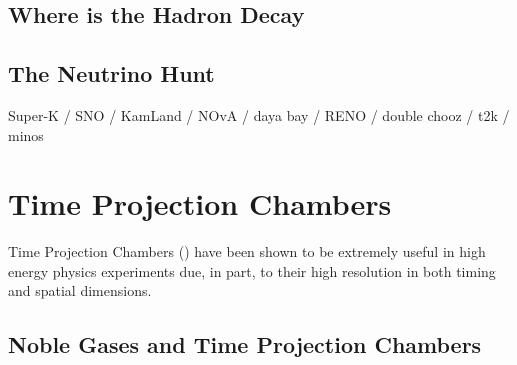 \subsection{Where is the Hadron Decay}



\subsection{The Neutrino Hunt}



Super-K / SNO / KamLand / NOvA / daya bay / RENO / double chooz / t2k / minos

\citep{SNO_2002_neutrino_PhysRevLett.89.011301, neutrino_measurement_NOvA_2019_prl, t2k_2011_neutrino_PhysRevLett.107.041801}
\cite{reno_2012_neutrino_PhysRevLett.108.191802}
\citep{FUKUDA2002_solar_neutrino_oscillation}
\citep{kamland_2003_neutrino_PhysRevLett.90.021802}
\citep{daya_bay_2012_neutrino_PhysRevLett.108.171803}
\citep{doubleChooz_2012_neutrino_PhysRevLett.108.131801}





\section{Time Projection Chambers}

Time Projection Chambers (\citep{lartpc:nygren}) have been shown to be extremely useful in high energy physics experiments due, in part, to their high resolution in both timing and spatial dimensions.


\subsection{Noble Gases and Time Projection Chambers}

